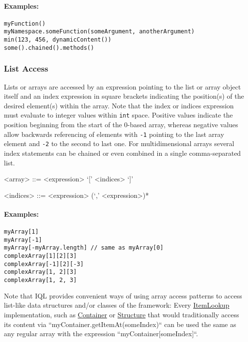 \documentclass[11pt]{article}
\newcommand{\iql}{IQL\xspace}
\newcommand{\repoUrl}{https://github.com/ICARUS-tooling/icarus2-modeling-framework/blob/dev/}
\newcommand{\modelsUrl}{\repoUrl icarus2-model-api/src/main/java/de/ims/icarus2/model/api/}
\newcommand{\repoLink}[2]{\href{#1}{#2}}
\begin{document}
\paragraph{Examples:}

\begin{verbatim}
myFunction()
myNamespace.someFunction(someArgument, anotherArgument)
min(123, 456, dynamicContent())
some().chained().methods()
\end{verbatim}

\subsubsection{List Access}
\label{sec:list-access}

Lists or arrays are accessed by an expression pointing to the list or array object itself and an index expression in square brackets indicating the position(s) of the desired element(s) within the array. Note that the index or indices expression must evaluate to integer values within \texttt{int} space. Positive values indicate the position beginning from the start of the 0-based array, whereas negative values allow backwards referencing of elements with \texttt{-1} pointing to the last array element and \texttt{-2} to the second to last one. For multidimensional arrays several index statements can be chained or even combined in a single comma-separated list.

\begin{grammar}	
	<array> ::= <expression> `[' <indices> `]'
	
	<indices> ::= <expression> (`,' <expression>)*
\end{grammar}

\paragraph{Examples:}

\begin{verbatim}
myArray[1]
myArray[-1]
myArray[-myArray.length] // same as myArray[0]
complexArray[1][2][3]
complexArray[-1][2][-3]
complexArray[1, 2][3]
complexArray[1, 2, 3]
\end{verbatim}

\noindent Note that \iql provides convenient ways of using array access patterns to access list-like data structures and/or classes of the framework:
Every \repoLink{\modelsUrl /members/item/manager/ItemLookup.java}{ItemLookup} implementation, such as \repoLink{\modelsUrl /members/container/Container.java}{Container} or \repoLink{/members/structure/Structure.java}{Structure} that would traditionally access its content via ``myContainer.getItemAt(someIndex)`` can be used the same as any regular array with the expression ``myContainer[someIndex]``.
\end{document}
